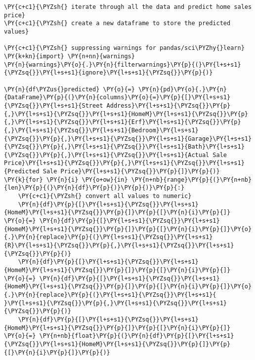     \begin{tcolorbox}[breakable, size=fbox, boxrule=1pt, pad at break*=1mm,colback=cellbackground, colframe=cellborder]
\begin{Verbatim}[commandchars=\\\{\}]
\PY{c+c1}{\PYZsh{} iterate through all the data and predict home sales price}
\PY{c+c1}{\PYZsh{} create a new dataframe to store the predicted values}

\PY{c+c1}{\PYZsh{} suppressing warnings for pandas/sci\PYZhy{}learn}
\PY{k+kn}{import} \PY{n+nn}{warnings}
\PY{n}{warnings}\PY{o}{.}\PY{n}{filterwarnings}\PY{p}{(}\PY{l+s+s1}{\PYZsq{}}\PY{l+s+s1}{ignore}\PY{l+s+s1}{\PYZsq{}}\PY{p}{)}

\PY{n}{df\PYZus{}predicted} \PY{o}{=} \PY{n}{pd}\PY{o}{.}\PY{n}{DataFrame}\PY{p}{(}\PY{n}{columns}\PY{o}{=}\PY{p}{[}\PY{l+s+s1}{\PYZsq{}}\PY{l+s+s1}{Street Address}\PY{l+s+s1}{\PYZsq{}}\PY{p}{,}\PY{l+s+s1}{\PYZsq{}}\PY{l+s+s1}{HomeM}\PY{l+s+s1}{\PYZsq{}}\PY{p}{,}\PY{l+s+s1}{\PYZsq{}}\PY{l+s+s1}{Erf}\PY{l+s+s1}{\PYZsq{}}\PY{p}{,}\PY{l+s+s1}{\PYZsq{}}\PY{l+s+s1}{Bedroom}\PY{l+s+s1}{\PYZsq{}}\PY{p}{,}\PY{l+s+s1}{\PYZsq{}}\PY{l+s+s1}{Garage}\PY{l+s+s1}{\PYZsq{}}\PY{p}{,}\PY{l+s+s1}{\PYZsq{}}\PY{l+s+s1}{Bath}\PY{l+s+s1}{\PYZsq{}}\PY{p}{,}\PY{l+s+s1}{\PYZsq{}}\PY{l+s+s1}{Actual Sale Price}\PY{l+s+s1}{\PYZsq{}}\PY{p}{,}\PY{l+s+s1}{\PYZsq{}}\PY{l+s+s1}{Predicted Sale Price}\PY{l+s+s1}{\PYZsq{}}\PY{p}{]}\PY{p}{)}
\PY{k}{for} \PY{n}{i} \PY{o+ow}{in} \PY{n+nb}{range}\PY{p}{(}\PY{n+nb}{len}\PY{p}{(}\PY{n}{df}\PY{p}{)}\PY{p}{)}\PY{p}{:}
    \PY{c+c1}{\PYZsh{} convert all values to numeric}
    \PY{n}{df}\PY{p}{[}\PY{l+s+s1}{\PYZsq{}}\PY{l+s+s1}{HomeM}\PY{l+s+s1}{\PYZsq{}}\PY{p}{]}\PY{p}{[}\PY{n}{i}\PY{p}{]} \PY{o}{=} \PY{n}{df}\PY{p}{[}\PY{l+s+s1}{\PYZsq{}}\PY{l+s+s1}{HomeM}\PY{l+s+s1}{\PYZsq{}}\PY{p}{]}\PY{p}{[}\PY{n}{i}\PY{p}{]}\PY{o}{.}\PY{n}{replace}\PY{p}{(}\PY{l+s+s1}{\PYZsq{}}\PY{l+s+s1}{R}\PY{l+s+s1}{\PYZsq{}}\PY{p}{,}\PY{l+s+s1}{\PYZsq{}}\PY{l+s+s1}{\PYZsq{}}\PY{p}{)}
    \PY{n}{df}\PY{p}{[}\PY{l+s+s1}{\PYZsq{}}\PY{l+s+s1}{HomeM}\PY{l+s+s1}{\PYZsq{}}\PY{p}{]}\PY{p}{[}\PY{n}{i}\PY{p}{]} \PY{o}{=} \PY{n}{df}\PY{p}{[}\PY{l+s+s1}{\PYZsq{}}\PY{l+s+s1}{HomeM}\PY{l+s+s1}{\PYZsq{}}\PY{p}{]}\PY{p}{[}\PY{n}{i}\PY{p}{]}\PY{o}{.}\PY{n}{replace}\PY{p}{(}\PY{l+s+s1}{\PYZsq{}}\PY{l+s+s1}{ }\PY{l+s+s1}{\PYZsq{}}\PY{p}{,}\PY{l+s+s1}{\PYZsq{}}\PY{l+s+s1}{\PYZsq{}}\PY{p}{)}
    \PY{n}{df}\PY{p}{[}\PY{l+s+s1}{\PYZsq{}}\PY{l+s+s1}{HomeM}\PY{l+s+s1}{\PYZsq{}}\PY{p}{]}\PY{p}{[}\PY{n}{i}\PY{p}{]} \PY{o}{=} \PY{n+nb}{float}\PY{p}{(}\PY{n}{df}\PY{p}{[}\PY{l+s+s1}{\PYZsq{}}\PY{l+s+s1}{HomeM}\PY{l+s+s1}{\PYZsq{}}\PY{p}{]}\PY{p}{[}\PY{n}{i}\PY{p}{]}\PY{p}{)}

\end{Verbatim}
\end{tcolorbox}
